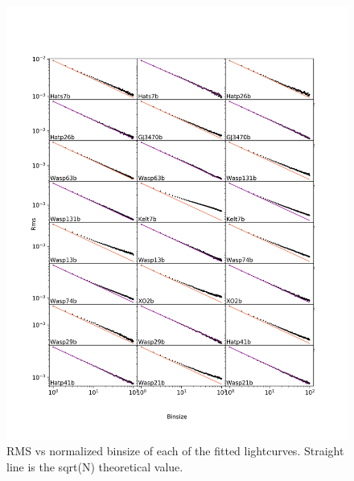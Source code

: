\begin{subappendices}
  \begin{figure}
    \includegraphics[width=\textwidth]{rmsVsbinsize0.pdf}
    \caption{RMS vs normalized binsize of each of the fitted lightcurves. Straight line is the sqrt(N) theoretical value.\label{P1:fig:rmsvsbin}}
  \end{figure}


\end{subappendices}
